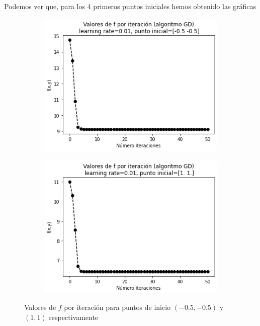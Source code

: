 \documentclass[11pt,a4paper]{article}
\theoremstyle{definition}
\begin{document}
\begin{itemize}
	Podemos ver que, para los 4 primeros puntos iniciales hemos obtenido las gráficas
	\begin{figure}[H]
		\centering
		\begin{subfigure}{.5\textwidth}
  		\centering
  		\includegraphics[width=1\textwidth]{images/1_3b_1}
  		\label{fig:sub1}
		\end{subfigure}%
		\begin{subfigure}{.5\textwidth}
  		\centering
  		\includegraphics[width=1\textwidth]{images/1_3b_2}
  		\label{fig:sub2}
		\end{subfigure}
		\caption{Valores de $f$ por iteración para puntos de inicio $(-0.5, -0.5)$ y $(1,1)$ respectivamente}
		\label{fig:test}
	\end{figure}
	

\end{itemize}
\end{document}
